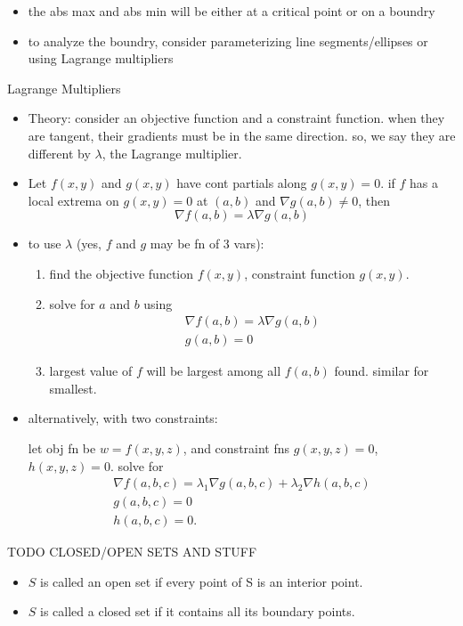 \documentclass[11pt]{article}
\theoremstyle{definition}
\newcommand{\col}[1]{\begin{minipage}{\columnwidth}#1\end{minipage}}
\begin{document}
\begin{multicols}{2}
{\begin{itemize}
      a cont function on a closed and bounded set has an abs min and abs max in the set
      \item the abs max and abs min will be either at a critical point or on a boundry
      \item to analyze the boundry, consider parameterizing line segments/ellipses or using Lagrange multipliers
    \end{itemize}
  }
  \col{
    Lagrange Multipliers
    \begin{itemize}
      \item Theory: consider an objective function and a constraint function. when they are tangent, their gradients must be in the same direction. so, we say they are different by $\lambda$, the Lagrange multiplier.
      \item Let $f(x,y)$ and $g(x,y)$ have cont partials along $g(x,y)=0$. if $f$ has a local extrema on $g(x,y)=0$ at $(a,b)$ and $\nabla g(a,b) \ne 0$, then
      \[ \nabla f(a,b) = \lambda \nabla g(a,b) \]
      \item to use $\lambda$ (yes, $f$ and $g$ may be fn of 3 vars):
      \begin{enumerate}
        \item find the objective function $f(x,y)$, constraint function $g(x,y)$.
        \item solve for $a$ and $b$ using
        \begin{gather*}
          \nabla f(a,b) = \lambda\nabla g(a,b) \\
          g(a,b)=0
        \end{gather*}
        \item largest value of $f$ will be largest among all $f(a,b)$ found. similar for smallest.
      \end{enumerate}
      \item alternatively, with two constraints:
      
      let obj fn be $w=f(x,y,z)$, and constraint fns $g(x,y,z)=0$, $h(x,y,z)=0$. solve for
      \begin{gather*}
        \nabla f(a,b,c) = \lambda_1\nabla g(a,b,c) + \lambda_2\nabla h(a,b,c) \\
        g(a,b,c) = 0 \\
        h(a,b,c) = 0.
      \end{gather*}
    \end{itemize}
    TODO CLOSED/OPEN SETS AND STUFF
    \begin{itemize}
      \item $S$ is called an open set if every point of S is an interior point.
      \item $S$ is called a closed set if it contains all its boundary points.
    \end{itemize}
  }
\end{multicols}
\end{document}
